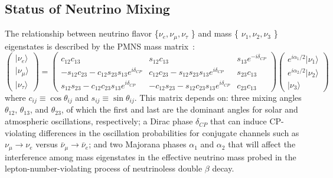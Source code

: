 \subsection{Status of Neutrino Mixing}\label{s:mix}

The relationship between neutrino flavor \{$\nu_e,\nu_\mu,\nu_\tau$ \} and mass \{ $\nu_1,\nu_2,\nu_3$ \} eigenstates is described 
by the PMNS mass matrix~\cite{Pontecorvo67,MNS}:
\begin{equation}
\left( \begin{array}{c} | \nu_e \rangle \\ | \nu_\mu \rangle \\ | \nu_\tau \rangle \end{array} \right) =
\left( \begin{array}{ccc} c_{12} c_{13} & s_{12} c_{13} & s_{13} e^{-i \delta_{CP}} \\
-s_{12}c_{23}-c_{12}s_{23} s_{13} e^{i \delta_{CP}} & c_{12}c_{23}-s_{12}s_{23}s_{13} e^{i \delta_{CP}} & s_{23} c_{13} \\
s_{12}s_{23}-c_{12}c_{23}s_{13} e^{i \delta_{CP}} & -c_{12}s_{23}-s_{12}c_{23}s_{13}e^{i \delta_{CP}} & c_{23} c_{13} \end{array}
\right) \left( \begin{array}{c} e^{i \alpha_1 /2} | \nu_1\rangle \\ e^{i \alpha_2 /2} | \nu_2 \rangle \\ | \nu_3 \rangle \end{array} \right)
\end{equation}
where $c_{ij} \equiv \cos{\theta_{ij}}$ and $s_{ij} \equiv \sin{\theta_{ij}}$.  
This matrix depends on:
three mixing angles $\theta_{12}$, $\theta_{13}$, and $\theta_{23}$, of which the first and last are the
dominant angles for solar and atmospheric oscillations, respectively; a Dirac phase $\delta_{CP}$ that
can induce CP-violating differences in the oscillation probabilities for
conjugate channels such as $\nu_\mu \rightarrow \nu_e$ versus
$\bar{\nu}_\mu \rightarrow \bar{\nu}_e$; and two Majorana phases $\alpha_1$ and $\alpha_2$
that will affect the interference among mass eigenstates in the effective neutrino mass probed
in the lepton-number-violating process of neutrinoless double $\beta$ decay.



